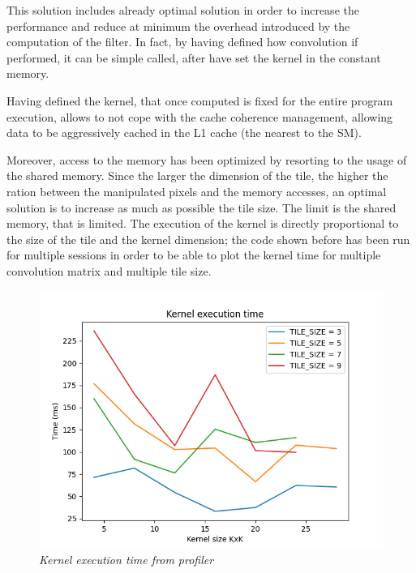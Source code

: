 \documentclass[paper=a4, fontsize=10pt]{scrartcl}	%
\begin{document}
	 This solution includes already optimal solution in order to increase the performance and reduce at minimum the overhead introduced by the computation of the filter. In fact, by having defined how convolution if performed, it can be simple called, after have set the kernel in the constant memory.
	 
	 Having defined the kernel, that once computed is fixed for the entire program execution, allows to not cope with the cache coherence management, allowing data to be aggressively cached in the L1 cache (the nearest to the SM).
	
	Moreover, access to the memory has been optimized by resorting to the usage of the shared memory. Since the larger the dimension of the tile, the higher the ration between the manipulated pixels and the memory accesses, an optimal solution is to increase as much as possible the tile size. The limit is the shared memory, that is limited. \newline\newline
	The execution of the kernel is directly proportional to the size of the tile and the kernel dimension; the code shown before has been run for multiple sessions in order to be able to plot the kernel time for multiple convolution matrix and multiple tile size.

	\begin{figure}[H]
		\centering
		\includegraphics[width=0.42\linewidth]{images/heatmap/kernel_time_noise_2.png}
		\caption{\textit{Kernel execution time from profiler}}
		\label{fig:noise_kernel_time}
	\end{figure}
\end{document}
